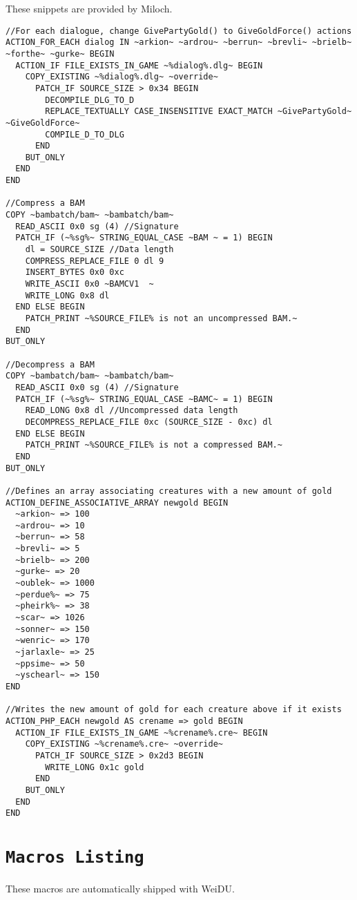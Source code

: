 \documentclass{article}
\def\DEFINE#1{{\tt \bf #1}\label{#1}\index{#1}}
\begin{document}
These snippets are provided by Miloch.
\begin{verbatim}
//For each dialogue, change GivePartyGold() to GiveGoldForce() actions
ACTION_FOR_EACH dialog IN ~arkion~ ~ardrou~ ~berrun~ ~brevli~ ~brielb~ ~forthe~ ~gurke~ BEGIN
  ACTION_IF FILE_EXISTS_IN_GAME ~%dialog%.dlg~ BEGIN
    COPY_EXISTING ~%dialog%.dlg~ ~override~
      PATCH_IF SOURCE_SIZE > 0x34 BEGIN
        DECOMPILE_DLG_TO_D
        REPLACE_TEXTUALLY CASE_INSENSITIVE EXACT_MATCH ~GivePartyGold~ ~GiveGoldForce~
        COMPILE_D_TO_DLG
      END
    BUT_ONLY
  END
END

//Compress a BAM
COPY ~bambatch/bam~ ~bambatch/bam~
  READ_ASCII 0x0 sg (4) //Signature
  PATCH_IF (~%sg%~ STRING_EQUAL_CASE ~BAM ~ = 1) BEGIN
    dl = SOURCE_SIZE //Data length
    COMPRESS_REPLACE_FILE 0 dl 9
    INSERT_BYTES 0x0 0xc
    WRITE_ASCII 0x0 ~BAMCV1  ~
    WRITE_LONG 0x8 dl
  END ELSE BEGIN
    PATCH_PRINT ~%SOURCE_FILE% is not an uncompressed BAM.~
  END
BUT_ONLY

//Decompress a BAM
COPY ~bambatch/bam~ ~bambatch/bam~
  READ_ASCII 0x0 sg (4) //Signature
  PATCH_IF (~%sg%~ STRING_EQUAL_CASE ~BAMC~ = 1) BEGIN
    READ_LONG 0x8 dl //Uncompressed data length
    DECOMPRESS_REPLACE_FILE 0xc (SOURCE_SIZE - 0xc) dl
  END ELSE BEGIN
    PATCH_PRINT ~%SOURCE_FILE% is not a compressed BAM.~
  END
BUT_ONLY

//Defines an array associating creatures with a new amount of gold
ACTION_DEFINE_ASSOCIATIVE_ARRAY newgold BEGIN
  ~arkion~ => 100
  ~ardrou~ => 10
  ~berrun~ => 58
  ~brevli~ => 5
  ~brielb~ => 200
  ~gurke~ => 20
  ~oublek~ => 1000
  ~perdue%~ => 75
  ~pheirk%~ => 38
  ~scar~ => 1026
  ~sonner~ => 150
  ~wenric~ => 170
  ~jarlaxle~ => 25
  ~ppsime~ => 50
  ~yschearl~ => 150
END

//Writes the new amount of gold for each creature above if it exists
ACTION_PHP_EACH newgold AS crename => gold BEGIN
  ACTION_IF FILE_EXISTS_IN_GAME ~%crename%.cre~ BEGIN
    COPY_EXISTING ~%crename%.cre~ ~override~
      PATCH_IF SOURCE_SIZE > 0x2d3 BEGIN
        WRITE_LONG 0x1c gold
      END
    BUT_ONLY
  END
END
\end{verbatim}



\section{\DEFINE{Macros Listing}}
These macros are automatically shipped with WeiDU.
\end{document}
